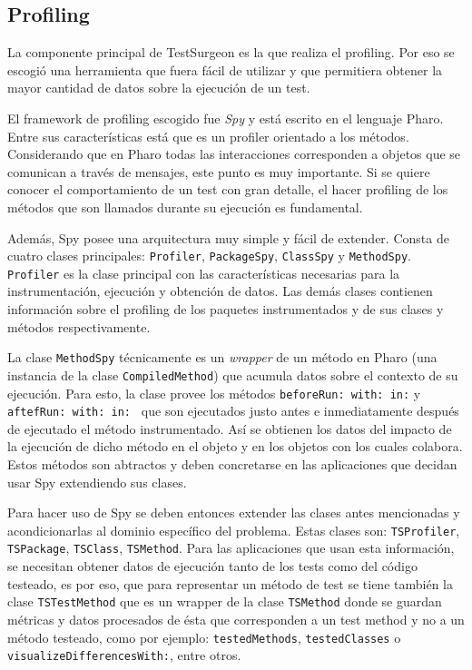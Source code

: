 \subsection{Profiling}
\par La componente principal de TestSurgeon es la que realiza el profiling. Por eso se escogió una herramienta que fuera fácil de utilizar y que permitiera obtener la mayor cantidad de datos sobre la ejecución de un test.
\par El framework de profiling escogido fue \emph{Spy} y está escrito en el lenguaje Pharo. Entre sus características está que es un profiler orientado a los métodos. Considerando que en Pharo todas las interacciones corresponden a objetos que se comunican a través de mensajes, este punto es muy importante. Si se quiere conocer el comportamiento de un test con gran detalle, el hacer profiling de los métodos que son llamados durante su ejecución es fundamental. 
\par Además, Spy posee una arquitectura muy simple y fácil de extender. Consta de cuatro clases principales: {\tt Profiler}, {\tt PackageSpy}, {\tt ClassSpy} y {\tt MethodSpy}. {\tt Profiler} es la clase principal con las características necesarias para la instrumentación, ejecución y obtención de datos. Las demás clases contienen información sobre el profiling de los paquetes instrumentados y de sus clases y métodos respectivamente. 
\par La clase {\tt MethodSpy} técnicamente es un \emph{wrapper} de un método en Pharo (una instancia de la clase {\tt CompiledMethod}) que acumula datos sobre el contexto de su ejecución. Para esto, la clase provee los métodos {\tt beforeRun: with: in:} y {\tt aftefRun: with: in: } que son ejecutados justo antes e inmediatamente después de ejecutado el método instrumentado. Así se obtienen los datos del impacto de la ejecución de dicho método en el objeto y en los objetos con los cuales colabora. Estos métodos son abtractos y deben concretarse en las aplicaciones que decidan usar Spy extendiendo sus clases. 


\par Para hacer uso de Spy se deben entonces extender las clases antes mencionadas y acondicionarlas al dominio específico del problema. Estas clases son: {\tt TSProfiler}, {\tt TSPackage}, {\tt TSClass}, {\tt TSMethod}. Para las aplicaciones que usan esta información, se necesitan obtener datos de ejecución tanto de los tests como del código testeado, es por eso, que para representar un método de test se tiene también la clase {\tt TSTestMethod} que es un wrapper de la clase {\tt TSMethod} donde se guardan métricas y datos procesados de ésta que corresponden a un test method y no a un método testeado, como por ejemplo: {\tt testedMethods}, {\tt testedClasses} o {\tt visualizeDifferencesWith:}, entre otros.

